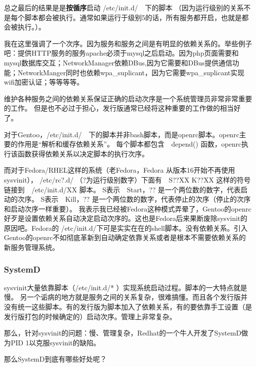 \documentclass[amstex,twoside]{ctexbook}
\begin{document}
总之最后的结果是是\textbf{按循序}启动 /etc/init.d/　下的脚本
（因为运行级别的关系不是每个脚本都会被执行。通常如果运行于级别5的话，所有服务都开启，也就是都会被执行。）。

我在这里强调了一个次序。因为服务和服务之间是有明显的依赖关系的。举些例子吧：提供HTTP服务的服务apache必须于mysql之后启动。因为php页面需要和mysql数据库交互；NetworkManager依赖DBus,因为它需要和DBus提供通信功能；NetworkManger同时也依赖wpa\_suplicant，因为它需要wpa\_suplicant实现wifi加密认证；等等等等。

维护各种服务之间的依赖关系保证正确的启动次序是一个系统管理员非常非常重要的工作。
但是也不必过于担心，发行版通常已经将这种重要的工作做的相当好了。

对于Gentoo，/etc/init.d/　下的脚本并非bash脚本，而是openrc脚本。openrc主要的作用是“解析和缓存依赖关系”。
每个脚本都包含　depend() 函数，openrc执行该函数获得依赖关系以决定脚本的执行次序。

而对于Fedora/RHEL这样的系统（老Fedora，Fedora 从版本16开始不再使用sysvinit）， /etc/rc?.d/ （?为运行级别数字）下面有　S??XX K??XX 这样的符号链接到　/etc/init.d/XX 脚本。 %
S表示　Start，?? 是一个两位数的数字，代表启动的次序。
S表示　Kill，?? 是一个两位数的数字，代表停止的次序（停止的次序和启动次序一样重要）。
我表示我已经被Fedora这种模式弄晕了，Gentoo的openrc好歹是设置依赖关系自动决定启动次序的。这也是Fedora后来果断废除sysvinit的原因吧。Fedora的 /etc/init.d/下可是实实在在的shell脚本。没有依赖关系。引入Gentoo的openrc不如彻底革新到自动确定依靠关系或者是根本不需要依赖关系的新服务管理系统。

\subsubsection{SystemD}
sysvinit大量依靠脚本（/etc/init.d/* ）实现系统启动过程。脚本的一大特点就是慢。
另一个诟病的地方就是服务之间的关系复杂，很难搞懂。而且各个发行版并没有统一这些脚本。有的发行版为脚本加入了依赖关系，有的要依靠手工设置（是发行版打包的时候确定的）启动次序。管理上非常复杂。

那么，针对sysvinit的问题：慢、管理复杂，Redhat的一个牛人开发了SystemD做为PID 1以克服sysvinit的缺陷。

那么SystemD到底有哪些好处呢？
\end{document}
